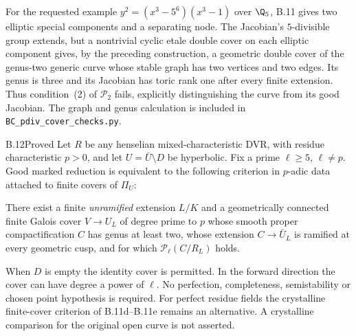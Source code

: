 For the requested example $y^2=(x^3-5^6)(x^3-1)$ over $\Q_5$,
B.11 gives two elliptic special components and a separating node.
The Jacobian's $5$-divisible group extends, but a nontrivial cyclic
etale double cover on each elliptic component gives, by the preceding
construction, a geometric double cover of the genus-two generic curve
whose stable graph has two vertices and two edges. Its genus is three
and its Jacobian has toric rank one after every finite extension.
Thus condition~(2) of $\mathcal P_2$ fails, explicitly distinguishing
the curve from its good Jacobian. The graph and genus calculation is
included in \texttt{BC\_pdiv\_cover\_checks.py}.

\begin{claim}{B.12}{Proved}
Let $R$ be any henselian mixed-characteristic DVR, with residue
characteristic $p>0$, and let $U=\bar U\setminus D$ be hyperbolic.
Fix a prime $\ell\ge5$, $\ell\ne p$. Good marked reduction is
equivalent to the following criterion in $p$-adic data attached to
finite covers of $\Pi_U$:

There exist a finite \emph{unramified} extension $L/K$ and a
geometrically connected finite Galois cover $V\to U_L$ of degree
prime to $p$ whose smooth proper compactification $C$ has genus at
least two, whose extension $C\to\bar U_L$ is ramified at every
geometric cusp, and for which $\mathcal P_\ell(C/R_L)$ holds.

When $D$ is empty the identity cover is permitted. In the forward
direction the cover can have degree a power of $\ell$. No
perfection, completeness, semistability or chosen point hypothesis
is required. For perfect residue fields the crystalline finite-cover
criterion of B.11d--B.11e remains an alternative. A crystalline
comparison for the original open curve is not asserted.
\end{claim}
